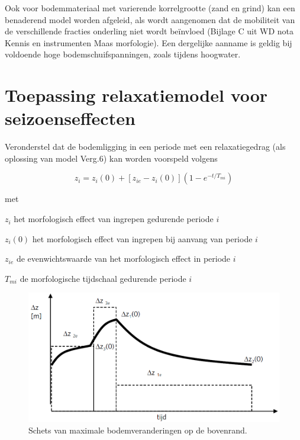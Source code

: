 Ook voor bodemmateriaal met varierende korrelgrootte (zand en grind) kan een benaderend model worden afgeleid, als wordt aangenomen dat de mobiliteit van de verschillende fracties onderling niet wordt be\"invloed (Bijlage C uit WD nota Kennis en instrumenten Maas morfologie).
Een dergelijke aanname is geldig bij voldoende hoge bodemschuifspanningen, zoals tijdens hoogwater.

\section{Toepassing relaxatiemodel voor seizoenseffecten}

Veronderstel dat de bodemligging in een periode met een relaxatiegedrag (als oplossing van model Verg.6) kan worden voorspeld volgens

\begin{equation}
z_i = z_i (0) + [z_{ie} - z_i(0)](1 - e^{-t/T_{mi}})
\end{equation}

met

\begin{symbollist}
\item[$z_i$]  het morfologisch effect van ingrepen gedurende periode $i$
\item[$z_i(0)$]  het morfologisch effect van ingrepen bij aanvang van periode $i$
\item[$z_{ie}$]  de evenwichtswaarde van het morfologisch effect in periode $i$
\item[$T_{mi}$]  de morfologische tijdschaal gedurende periode $i$
\end{symbollist}

\begin{figure}
\includegraphics[width=\columnwidth]{figures/Fig5.png}
\caption{Schets van maximale bodemveranderingen op de bovenrand.}
\label{Fig5}
\end{figure}

